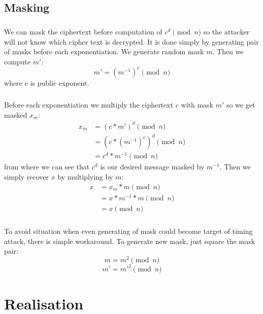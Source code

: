 \documentclass[thesis=B,english]{FITthesis}[2012/10/20]
\begin{document}
{{\section{Masking}
\paragraph*{}{
We can mask the ciphertext before computation of \(c^d \pmod{n}\) so the attacker will not know which cipher text is decrypted. It is done simply by generating pair of masks 
before each exponentiation. We generate random mask \(m\). Then we compute \(m'\):
\[ m' = (m^{-1})^e \pmod{n}\]
where \(e\) is public exponent.
}
\paragraph*{}
{Before each exponentiation we multiply the ciphertext \(c\) with mask \(m'\) so we get masked \(x_m\):
\begin{equation}
\begin{split}
 x_m & = (c*m')^d \pmod{n} \\
 & = (c * (m^{-1})^e)^d \pmod{n}  \\
 & = c^d * m^{-1} \pmod{n}
\end{split}
\end{equation}
from where we can see that \(c^d\) is our desired message masked by \(m^{-1}\). Then we simply recover \(x\) by multiplying by \(m\):\cite{Kocher1996}
\begin{equation}
\begin{split}
 x & = x_m * m \pmod{n} \\
 & = x * m^{-1} * m \pmod{n}  \\
 & = x \pmod{n}
\end{split}
\end{equation}
}

\paragraph*{}{
To avoid situation when even generating of mask could become target of timing attack, there is simple workaround. To generate new mask, just square the mask pair:\cite{Kocher1996}
\[m = m^2 \pmod{n}\]
\[m' = m'^2 \pmod{n}\]

}

\chapter{Realisation}

}}
\end{document}
